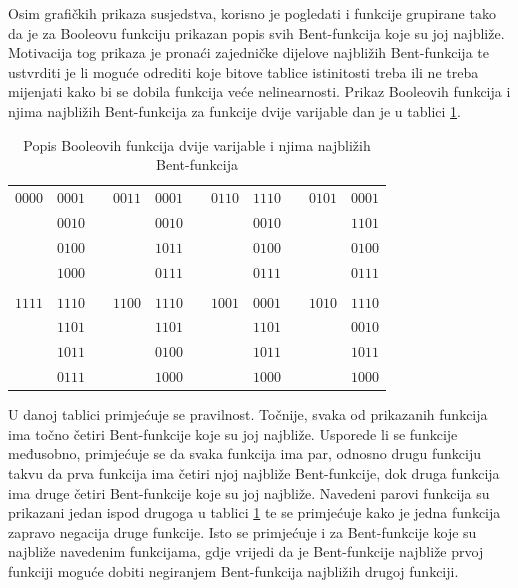 Osim grafičkih prikaza susjedstva, korisno je pogledati i funkcije grupirane tako da je za Booleovu funkciju prikazan popis svih Bent-funkcija koje su joj najbliže.
Motivacija tog prikaza je pronaći zajedničke dijelove najbližih Bent-funkcija te ustvrditi je li moguće odrediti koje bitove tablice istinitosti treba ili ne treba mijenjati kako bi se dobila funkcija veće nelinearnosti.
Prikaz Booleovih funkcija i njima najbližih Bent-funkcija za funkcije dvije varijable dan je u tablici \ref{tbl:neighbor}.
\begin{table}[]
\centering
\caption{Popis Booleovih funkcija dvije varijable i njima najbližih Bent-funkcija}
\begin{tabular}{ccccccccccc}
$0000$ & $0001$ &  & $0011$ & $0001$ &  & $0110$ & $1110$ &  & $0101$ & $0001$ \\
       & $0010$ &  &        & $0010$ &  &        & $0010$ &  &        & $1101$ \\
       & $0100$ &  &        & $1011$ &  &        & $0100$ &  &        & $0100$ \\
       & $1000$ &  &        & $0111$ &  &        & $0111$ &  &        & $0111$ \\
       &        &  &        &        &  &        &        &  &        &        \\
$1111$ & $1110$ &  & $1100$ & $1110$ &  & $1001$ & $0001$ &  & $1010$ & $1110$ \\
       & $1101$ &  &        & $1101$ &  &        & $1101$ &  &        & $0010$ \\
       & $1011$ &  &        & $0100$ &  &        & $1011$ &  &        & $1011$ \\
       & $0111$ &  &        & $1000$ &  &        & $1000$ &  &        & $1000$ \\
\end{tabular}
\label{tbl:neighbor}
\end{table}
U danoj tablici primjećuje se pravilnost.
Točnije, svaka od prikazanih funkcija ima točno četiri Bent-funkcije koje su joj najbliže.
Usporede li se funkcije međusobno, primjećuje se da svaka funkcija ima par, odnosno drugu funkciju takvu da prva funkcija ima četiri njoj najbliže Bent-funkcije, dok druga funkcija ima druge četiri Bent-funkcije koje su joj najbliže.
Navedeni parovi funkcija su prikazani jedan ispod drugoga u tablici \ref{tbl:neighbor} te se primjećuje kako je jedna funkcija zapravo negacija druge funkcije.
Isto se primjećuje i za Bent-funkcije koje su najbliže navedenim funkcijama, gdje vrijedi da je Bent-funkcije najbliže prvoj funkciji moguće dobiti negiranjem Bent-funkcija najbližih drugoj funkciji.
